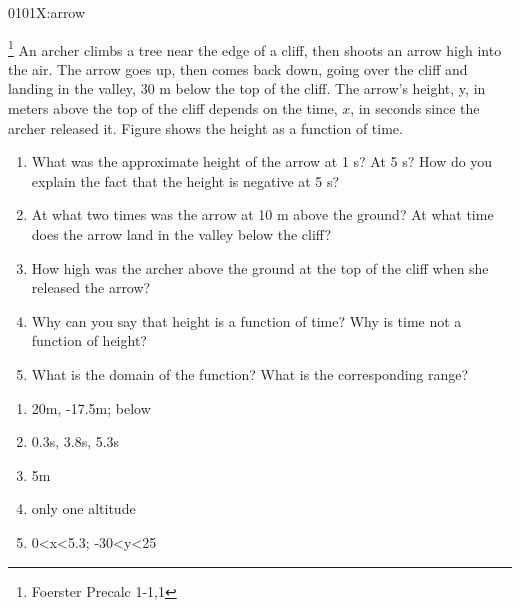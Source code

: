 
\begin{defproblem}{0101X:arrow}
\begin{onlyproblem}
\begin{exercise}
\footnote{Foerster Precalc 1-1,1}
An archer climbs a tree near
the edge of a cliff, then shoots an arrow high
into the air. The arrow goes up, then comes
back down, going over the cliff and landing in
the valley, 30 m below the top of the cliff. The
arrow’s height, y, in meters above the top of
the cliff depends on the time, $x$, in seconds
since the archer released it. Figure shows
the height as a function of time.
\begin{enumerate}
\item What was the approximate height of the
arrow at 1 s? At 5 s? How do you explain the
fact that the height is negative at 5 s?
\item At what two times was the arrow at 10 m
above the ground? At what time does the
arrow land in the valley below the cliff?
\item How high was the archer above the ground
at the top of the cliff when she released the
arrow?
\item Why can you say that height is a function of
time? Why is time not a function of height?
\item What is the domain of the function? What is
the corresponding range?
\end{enumerate}%
\end{exercise}%
\end{onlyproblem}%
\begin{onlysolution}%
\begin{enumerate}
\item 20m, -17.5m; below
\item 0.3s, 3.8s, 5.3s
\item 5m
\item only one altitude
\item 0<x<5.3; -30<y<25
\end{enumerate}
\end{onlysolution}%
\end{defproblem}


\endinput
